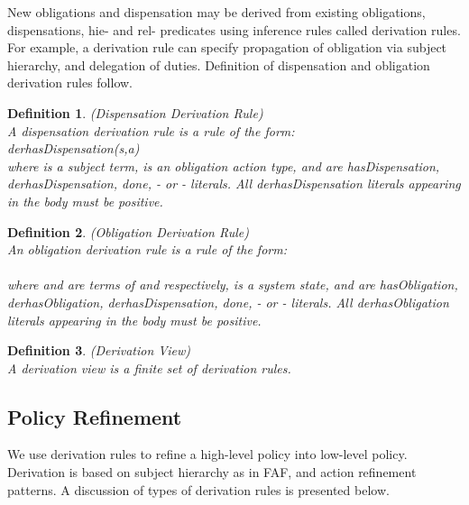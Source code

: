 \documentclass[12pt,journal,letterpaper,onecolumn]{IEEEtran}
\newtheorem{definition}{Definition}[section]
\begin{document}
New obligations and dispensation may be derived from existing
obligations, dispensations, hie- and rel- predicates using inference
rules called derivation rules. For example, a derivation rule can
specify propagation of obligation via subject hierarchy, and
delegation of duties. Definition of dispensation and obligation
derivation rules follow.

\begin{definition}(Dispensation Derivation Rule)\\
A {\em dispensation derivation rule} is a rule of the form: \\
{\ttfamily derhasDispensation(s,a)}  \\
where  is a subject term,  is an obligation action type, and
 are {\ttfamily hasDispensation,
derhasDispensation, done}, - or - literals. All {\ttfamily
derhasDispensation} literals appearing in the body must be positive.
\label{def:derdispensationrule}
\end{definition}



\begin{definition}(Obligation Derivation Rule)\\
An {\em obligation derivation rule} is a rule of the form: \\
 \\
where  and  are terms of  and  respectively,  is a
system state, and  are {\ttfamily hasObligation,
derhasObligation, derhasDispensation, done}, - or -
literals. All {\ttfamily derhasObligation} literals appearing in the
body must be positive.\label{def:derivationrule}
\end{definition}

\begin{definition}(Derivation View)\\
A derivation view is a finite set of derivation rules.
\end{definition}

\subsection{Policy Refinement}

We use derivation rules to refine a high-level policy into low-level
policy. Derivation is based on subject hierarchy as in FAF, and
action refinement patterns. A discussion of types of derivation rules
is presented below.
\end{document}
